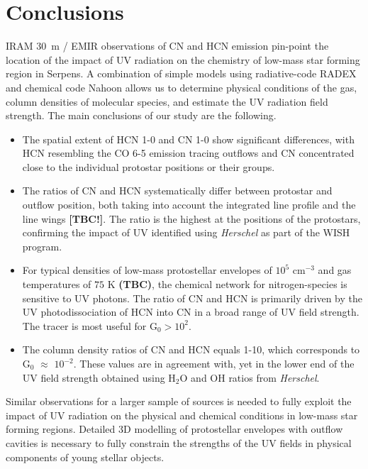 \documentclass{aa}
\begin{document}
\section{Conclusions}
IRAM 30~m / EMIR observations of CN and HCN emission pin-point the location 
of the impact of UV radiation on the chemistry of low-mass star forming region in Serpens. 
A combination of simple models using radiative-code RADEX and chemical code Nahoon 
allows us to determine physical conditions of the gas, column densities of molecular species,
 and estimate the UV radiation field strength. The main conclusions of our study are the 
 following. 
\begin{itemize} 
\item The spatial extent of HCN 1-0 and CN 1-0 show significant differences, with 
HCN resembling the CO 6-5 emission tracing outflows and CN concentrated close to the 
individual protostar positions or their groups.
\item The ratios of CN and HCN systematically differ between protostar and outflow position,
both taking into account the integrated line profile and the line wings \textbf{[TBC!]}. The ratio 
is the highest at the positions of the protostars, confirming the impact of UV identified 
using \textit{Herschel} as part of the WISH program. 
\item For typical densities of low-mass protostellar envelopes of $10^5$ cm$^{-3}$ and 
gas temperatures of $75$ K \textbf{(TBC)}, the chemical network for nitrogen-species is sensitive 
to UV photons. The ratio of CN and HCN is primarily driven by the UV photodissociation of HCN into CN 
in a broad range of UV field strength. The tracer is most useful for G$_\mathrm{0}>10^{2}$. 
\item The column density ratios of CN and HCN equals 1-10, which corresponds to G$_0$ $\approx$ $10^{-2}$. 
These values are in agreement with, yet in the lower end of the UV field strength obtained using 
H$_2$O and OH ratios from \textit{Herschel}.
\end{itemize}

Similar observations for a larger sample of sources is needed to fully exploit 
the impact of UV radiation on the physical and chemical conditions in low-mass star 
forming regions. Detailed 3D modelling of protostellar envelopes with outflow cavities 
is necessary to fully constrain the strengths of the UV fields in physical components 
of young stellar objects.
\end{document}
